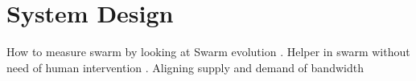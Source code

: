 \chapter{System Design}
\label{chp:design}

How to measure swarm by looking at Swarm evolution \cite{2013:swarmevolution:su}.
Helper in swarm without need of human intervention \cite{2014:bwmarket:capota}. Aligning supply and demand of bandwidth